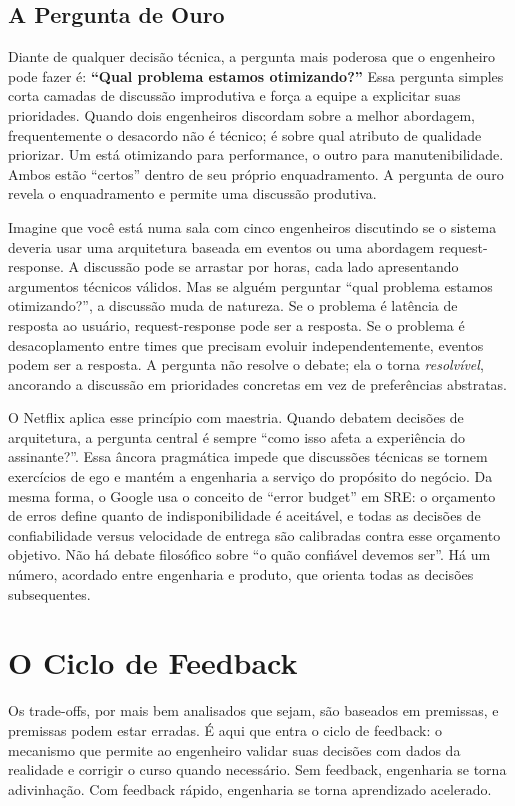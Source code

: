 \subsection{A Pergunta de Ouro}

Diante de qualquer decisão técnica, a pergunta mais poderosa que o
engenheiro pode fazer é: \textbf{``Qual problema estamos otimizando?''}
Essa pergunta simples corta camadas de discussão improdutiva e força a
equipe a explicitar suas prioridades. Quando dois engenheiros discordam
sobre a melhor abordagem, frequentemente o desacordo não é técnico;
é sobre qual atributo de qualidade priorizar. Um está otimizando para
performance, o outro para manutenibilidade. Ambos estão ``certos'' dentro
de seu próprio enquadramento. A pergunta de ouro revela o enquadramento
e permite uma discussão produtiva.

Imagine que você está numa sala com cinco engenheiros discutindo se o
sistema deveria usar uma arquitetura baseada em eventos ou uma abordagem
request-response. A discussão pode se arrastar por horas, cada lado
apresentando argumentos técnicos válidos. Mas se alguém perguntar ``qual
problema estamos otimizando?'', a discussão muda de natureza. Se o
problema é latência de resposta ao usuário, request-response pode ser a
resposta. Se o problema é desacoplamento entre times que precisam evoluir
independentemente, eventos podem ser a resposta. A pergunta não resolve
o debate; ela o torna \emph{resolvível}, ancorando a discussão em
prioridades concretas em vez de preferências abstratas.

O Netflix aplica esse princípio com maestria. Quando debatem decisões de
arquitetura, a pergunta central é sempre ``como isso afeta a experiência
do assinante?''. Essa âncora pragmática impede que discussões técnicas se
tornem exercícios de ego e mantém a engenharia a serviço do propósito do
negócio. Da mesma forma, o Google usa o conceito de ``error budget'' em
SRE: o orçamento de erros define quanto de indisponibilidade é aceitável,
e todas as decisões de confiabilidade versus velocidade de entrega são
calibradas contra esse orçamento objetivo. Não há debate filosófico sobre
``o quão confiável devemos ser''. Há um número, acordado entre
engenharia e produto, que orienta todas as decisões subsequentes.

\section{O Ciclo de Feedback}

Os trade-offs, por mais bem analisados que sejam, são baseados em
premissas, e premissas podem estar erradas. É aqui que entra o ciclo
de feedback: o mecanismo que permite ao engenheiro validar suas decisões
com dados da realidade e corrigir o curso quando necessário. Sem feedback,
engenharia se torna adivinhação. Com feedback rápido, engenharia se torna
aprendizado acelerado.

